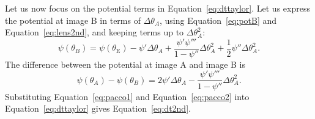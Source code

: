 \documentclass[usenatbib]{mnras}
\def\psii{\psi'}
\def\psiii{\psi''}
\def\psiiii{\psi'''}
\def\tein{\theta_{\mathrm{E}}}
\def\Eref#1{Equation~\ref{#1}\xspace}
\begin{document}
Let us now focus on the potential terms in \Eref{eq:dttaylor}.
Let us express the potential at image B in terms of $\Delta\theta_A$, using \Eref{eq:potB} and \Eref{eq:lens2nd}, and keeping terms up to $\Delta\theta_A^2$:
\begin{equation}
\psi(\theta_B) = \psi(\tein) - \psii\Delta\theta_A + \frac{\psii\psiiii}{1-\psiii}\Delta\theta_A^2 + \frac12\psiii\Delta\theta_A^2.
\end{equation}
The difference between the potential at image A and image B is
\begin{equation}\label{eq:pacco2}
\psi(\theta_A) - \psi(\theta_B) = 2\psii\Delta\theta_A - \frac{\psii\psiiii}{1-\psiii}\Delta\theta_A^2.
\end{equation}
Substituting \Eref{eq:pacco1} and \Eref{eq:pacco2} into \Eref{eq:dttaylor} gives \Eref{eq:dt2nd}.
\end{document}
